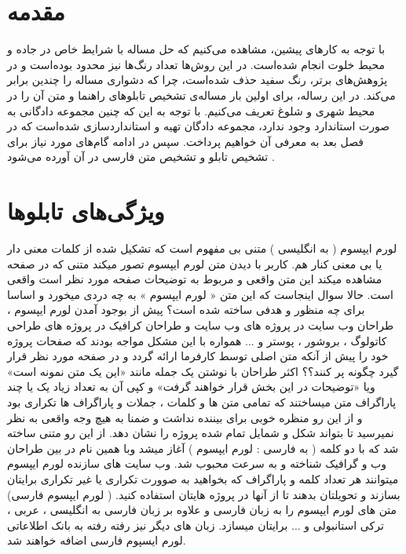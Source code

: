 
\pagebreak

\section{مقدمه}
 
با توجه به کارهای پیشین، مشاهده می‌کنیم که حل مساله با شرایط خاص در جاده و محیط خلوت انجام شده‌است. در این روش‌ها تعداد رنگ‌ها نیز محدود بوده‌است و در پژوهش‌های برتر، رنگ سفید حذف شده‌است، چرا که دشواری مساله را چندین برابر می‌کند. در این رساله، برای اولین بار مساله‌ی تشخیص تابلوهای راهنما و متن آن را در محیط شهری و شلوغ تعریف می‌کنیم. با توجه به این که چنین مجموعه‌ دادگانی به صورت استاندارد وجود ندارد، مجموعه دادگان تهیه و استانداردسازی شده‌است که در فصل بعد به معرفی آن خواهیم پرداخت. سپس در ادامه گام‌های مورد نیاز برای تشخیص تابلو و تشخیص متن فارسی در آن آورده می‌شود \cite{khazaee2016aut}. 


\section{ویژگی‌های تابلوها}
\label{subsec:panelattr}لورم ایپسوم ( به انگلیسی  ) متنی بی مفهوم است که تشکیل شده از کلمات معنی دار یا بی معنی کنار هم. کاربر با دیدن متن لورم ایپسوم تصور میکند متنی که در صفحه مشاهده میکند این متن واقعی و مربوط به توضیحات صفحه مورد نظر است واقعی است. حالا سوال اینجاست که این متن « لورم ایپسوم » به چه دردی میخورد و اساسا برای چه منظور و هدفی ساخته شده است؟ پیش از بوجود آمدن لورم ایپسوم ، طراحان وب سایت در پروژه های وب سایت و طراحان کرافیک در پروژه های طراحی کاتولوگ ، بروشور ، پوستر و ... همواره با این مشکل مواجه بودند که صفحات پروژه خود را پیش از آنکه متن اصلی توسط کارفرما ارائه گردد و در صفحه مورد نظر قرار گیرد چگونه پر کنند؟؟ اکثر طراحان با نوشتن یک جمله مانند «این یک متن نمونه است» ویا «توضیحات در این بخش قرار خواهند گرفت» و کپی آن به تعداد زیاد یک یا چند پاراگراف متن میساختند که تمامی متن ها و کلمات ، جملات و پاراگراف ها تکراری بود و از این رو منظره خوبی برای بیننده نداشت و ضمنا به هیچ وجه واقعی به نظر نمیرسید تا بتواند شکل و شمایل تمام شده پروژه را نشان دهد. از این رو متنی ساخته شد که با دو کلمه ( به فارسی : لورم ایپسوم ) آغاز میشد وبا همین نام در بین طراحان وب و گرافیک شناخته و به سرعت محبوب شد. وب سایت های سازنده لورم ایپسوم میتوانند هر تعداد کلمه و پاراگراف که بخواهید به صوورت تکراری یا غیر تکراری برایتان بسازند و تحویلتان بدهند تا از آنها در پروژه هایتان استفاده کنید. ( لورم ایپسوم فارسی) متن های لورم ایپسوم را به زبان فارسی و علاوه بر زبان فارسی به انگلیسی ، عربی ، ترکی استانبولی و ... برایتان میسازد. زبان های دیگر نیز رفته رفته به بانک اطلاعاتی لورم ایسپوم فارسی اضافه خواهند شد.  


